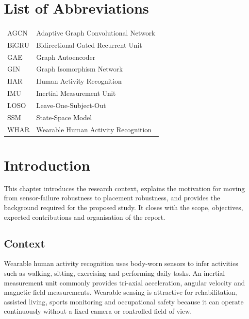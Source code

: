 \documentclass[12pt,a4paper,twoside,openright]{report}
\begin{document}
\cleardoublepage
\tableofcontents
\cleardoublepage
\listoffigures
{}
\cleardoublepage
\listoftables
{}

\cleardoublepage
\chapter*{List of Abbreviations}
\begin{center}
\begin{minipage}{0.82\textwidth}
\begin{tabularx}{\textwidth}{@{}P{0.22\textwidth}Y@{}}
AGCN & Adaptive Graph Convolutional Network \\
BiGRU & Bidirectional Gated Recurrent Unit \\
GAE & Graph Autoencoder \\
GIN & Graph Isomorphism Network \\
HAR & Human Activity Recognition \\
IMU & Inertial Measurement Unit \\
LOSO & Leave-One-Subject-Out \\
SSM & State-Space Model \\
WHAR & Wearable Human Activity Recognition \\
\end{tabularx}
\end{minipage}
\end{center}

\cleardoublepage
{}

\cleardoublepage
\chapter{Introduction}

This chapter introduces the research context, explains the motivation for moving from sensor-failure robustness to placement robustness, and provides the background required for the proposed study. It closes with the scope, objectives, expected contributions and organisation of the report.

\section{Context}
Wearable human activity recognition uses body-worn sensors to infer activities such as walking, sitting, exercising and performing daily tasks. An inertial measurement unit commonly provides tri-axial acceleration, angular velocity and magnetic-field measurements. Wearable sensing is attractive for rehabilitation, assisted living, sports monitoring and occupational safety because it can operate continuously without a fixed camera or controlled field of view.
\end{document}

